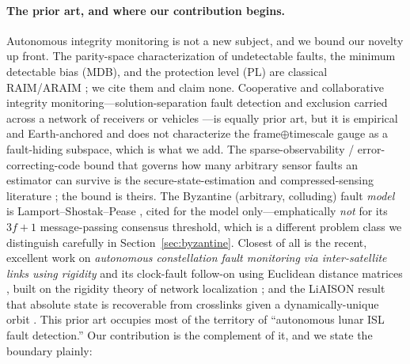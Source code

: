 \paragraph{The prior art, and where our contribution begins.}
Autonomous integrity monitoring is not a new subject, and we bound our novelty up front. The
parity-space characterization of undetectable faults, the minimum detectable bias (MDB), and
the protection level (PL) are classical RAIM/ARAIM \citep{sturza1988,brown1992,parkinson1988,%
baarda1968,teunissen2006,blanch2015,joerger2014}; we cite them and claim none. Cooperative and
collaborative integrity monitoring---solution-separation fault detection and exclusion
\citep{joerger2014} carried across a network of receivers or vehicles \citep{bhamidipati2019coop}---is
equally prior art, but it is empirical and Earth-anchored and does not characterize the
frame$\oplus$timescale gauge as a fault-hiding subspace, which is what we add. The
sparse-observability / error-correcting-code bound that governs how many arbitrary sensor
faults an estimator can survive is the secure-state-estimation and compressed-sensing
literature \citep{fawzi2014,shoukry2016,candes2005,donoho2003}; the bound is theirs. The
Byzantine (arbitrary, colluding) fault \emph{model} is Lamport--Shostak--Pease
\citep{lamport1982}, cited for the model only---emphatically \emph{not} for its $3f+1$
message-passing consensus threshold, which is a different problem class we distinguish
carefully in Section~\ref{sec:byzantine}. Closest of all is the recent, excellent work on
\emph{autonomous constellation fault monitoring via inter-satellite links using rigidity}
\citep{iiyama2024} and its clock-fault follow-on using Euclidean distance matrices
\citep{iiyama2025edm}, built on the rigidity theory of network localization
\citep{aspnes2006}; and the LiAISON result that absolute state is recoverable from crosslinks
given a dynamically-unique orbit \citep{hillborn2007}. This prior art occupies most of the
territory of ``autonomous lunar ISL fault detection.'' Our contribution is the complement of
it, and we state the boundary plainly:
